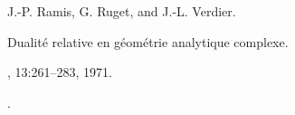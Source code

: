 J.-P. Ramis, G. Ruget, and J.-L. Verdier.

\newblock Dualit{\'e} relative en g{\'e}om{\'e}trie analytique complexe.

, 13:261--283, 1971.

\newblock {}.

